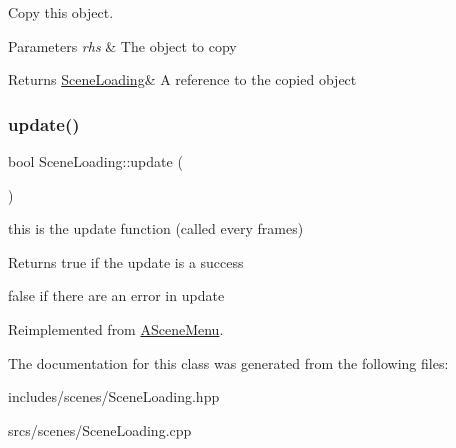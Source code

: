 Copy this object. 


\begin{DoxyParams}{Parameters}
{\em rhs} & The object to copy \\
\hline
\end{DoxyParams}
\begin{DoxyReturn}{Returns}
\hyperlink{class_scene_loading}{Scene\+Loading}\& A reference to the copied object 
\end{DoxyReturn}
\mbox{\label{class_scene_loading_a5b4f2b636e55908bb2f29180aa875201}} 
\subsubsection{\texorpdfstring{update()}{update()}}
{\footnotesize\ttfamily bool Scene\+Loading\+::update (\begin{DoxyParamCaption}{ }\end{DoxyParamCaption})\hspace{0.3cm}{\ttfamily [virtual]}}



this is the update function (called every frames) 

\begin{DoxyReturn}{Returns}
true if the update is a success 

false if there are an error in update 
\end{DoxyReturn}


Reimplemented from \hyperlink{class_a_scene_menu_a1deeb5fd9be97376998cd2af36f29744}{A\+Scene\+Menu}.



The documentation for this class was generated from the following files\+:\begin{DoxyCompactItemize}
\item 
includes/scenes/Scene\+Loading.\+hpp\item 
srcs/scenes/Scene\+Loading.\+cpp\end{DoxyCompactItemize}
